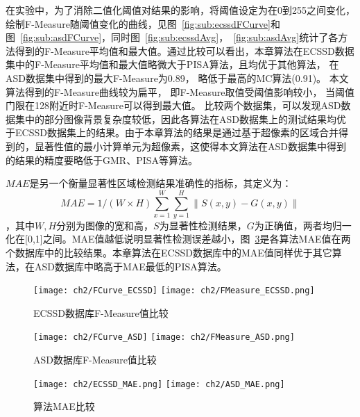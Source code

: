 在实验中，为了消除二值化阈值对结果的影响，将阈值设定为在0到255之间变化，绘制F-Measure随阈值变化的曲线，见图~\ref{fig:sub:ecssdFCurve}和图~\ref{fig:sub:asdFCurve}，同时图~\ref{fig:sub:ecssdAvg}，~\ref{fig:sub:asdAvg}统计了各方法得到的F-Measure平均值和最大值。通过比较可以看出，本章算法在ECSSD数据集中的F-Measure平均值和最大值略微大于PISA算法，且均优于其他算法， 在ASD数据集中得到的最大F-Measure为0.89， 略低于最高的MC算法(0.91)。 本文算法得到的F-Measure曲线较为扁平， 即F-Measure取值受阈值影响较小， 当阈值门限在128附近时F-Measure可以得到最大值。 比较两个数据集，可以发现ASD数据集中的部分图像背景复杂度较低，因此各算法在ASD数据集上的测试结果均优于ECSSD数据集上的结果。由于本章算法的结果是通过基于超像素的区域合并得到的，显著性值的最小计算单元为超像素，这使得本文算法在ASD数据集中得到的结果的精度要略低于GMR、PISA等算法。 \par
$MAE$是另一个衡量显著性区域检测结果准确性的指标，其定义为：
$$MAE=1/(W\times H) \sum_{x=1}^W\sum_{y=1}^H \| S(x,y)-G(x,y)\|$$ ，其中$W,H$分别为图像的宽和高，$S$为显著性检测结果，$G$为正确值，两者均归一化在[0,1]之间。MAE值越低说明显著性检测误差越小，图~\ref{fig:MAERst}是各算法MAE值在两个数据库中的比较结果。本章算法在ECSSD数据库中的MAE值同样优于其它算法，在ASD数据库中略高于MAE最低的PISA算法。\par
\begin{figure}[h]
  \centering%
    {\texttt{[image: ch2/FCurve\_ECSSD]}}%
      {\texttt{[image: ch2/FMeasure\_ECSSD.png]}}
  \caption{ECSSD数据库F-Measure值比较}
  \label{fig:ECSSDRst}
\end{figure}

\begin{figure}[h]
  \centering%
    {\texttt{[image: ch2/FCurve\_ASD]}}%
      {\texttt{[image: ch2/FMeasure\_ASD.png]}}
  \caption{ASD数据库F-Measure值比较}
  \label{fig:ASDRst}
\end{figure}

\begin{figure}[h]
  \centering%
    {\texttt{[image: ch2/ECSSD\_MAE.png]}}%
      {\texttt{[image: ch2/ASD\_MAE.png]}}
  \caption{算法MAE比较}
  \label{fig:MAERst}
\end{figure}

